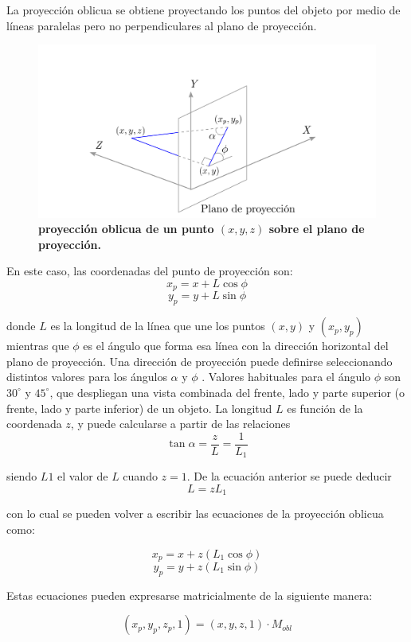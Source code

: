 \vspace{5mm}
La proyección oblicua se obtiene proyectando los puntos del objeto por medio de líneas paralelas pero no perpendiculares al plano de proyección.

\begin{figure}[h]
    \includegraphics[width=12cm]{Img/GEO/geo-per-5.png}
    \centering
    \caption{\footnotesize{\textbf{proyección oblicua de un punto $(x, y, z)$ sobre el plano de proyección.}}}
    \label{geo-per5}
\end{figure}

En este caso, las coordenadas del punto de proyección son:
$$x_p = x + L\cos{\phi}$$
$$y_p = y + L\sin{\phi}$$

donde $L$ es la longitud de la línea que une los puntos $(x, y)$ y $(x_p, y_p)$ mientras que $\phi$ es el ángulo que forma esa línea con la dirección horizontal del plano de proyección.
Una dirección de proyección puede definirse seleccionando distintos valores para los ángulos $\alpha$ y
$\phi$ . Valores habituales para el ángulo $\phi$ son $30^{\circ}$ y
$45^{\circ}$, que despliegan una vista combinada del frente, lado y parte superior (o frente, lado y parte inferior) de un objeto. La longitud $L$ es función de la coordenada $z$, y puede calcularse a partir de las relaciones
$$\tan{\alpha} = \frac{z}{L} = \frac{1}{L_1}$$

siendo $L1$ el valor de $L$ cuando $z = 1$. De la ecuación anterior se puede deducir 
$$L = z{L}_1$$

con lo cual se pueden volver a escribir las ecuaciones de la proyección oblicua como:

$$x_p = x + z(L_1\cos{\phi})$$
$$y_p = y + z(L_1\sin{\phi})$$

Estas ecuaciones pueden expresarse matricialmente de la siguiente manera:

$$(x_p, y_p, z_p, 1)=(x, y, z, 1) \cdot M_{obl}$$

